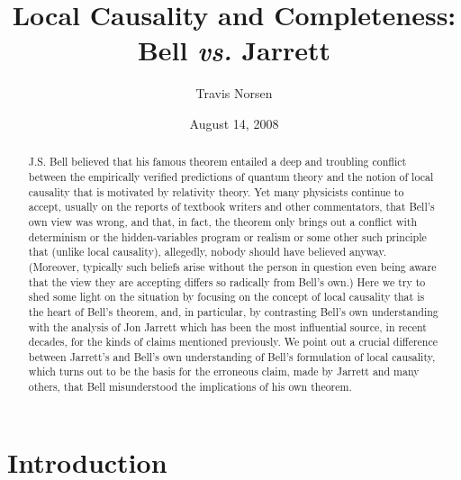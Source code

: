 \documentclass[aps,prc,twocolumn]{revtex4}
\begin{document}
\title{Local Causality and Completeness:  Bell \emph{vs.} Jarrett}
\author{Travis Norsen}

\date{August 14, 2008}

\begin{abstract}
J.S. Bell believed that his famous theorem entailed a deep and
troubling conflict between the empirically verified predictions of
quantum theory and the notion of local causality that is motivated by
relativity theory.  Yet many physicists continue to accept, usually on 
the reports of textbook writers and other commentators, that Bell's
own view was wrong, and that, in fact, the theorem only brings out a
conflict with determinism or the hidden-variables program or realism
or some other such principle that (unlike local causality), allegedly,
nobody should have believed anyway.  (Moreover, typically such beliefs
arise without the person in question even being aware that the view
they are accepting differs so radically from Bell's own.)
Here we try to shed some light
on the situation by focusing on the concept of local causality that is
the heart of Bell's theorem, and, in particular, by contrasting Bell's
own understanding with the analysis of Jon Jarrett which has been the
most influential source, in recent decades, for the kinds of claims
mentioned previously.  We point out a crucial difference between 
Jarrett's and Bell's own understanding of Bell's formulation of 
local causality, which turns out to be the basis for the erroneous 
claim, made by Jarrett and many others, that Bell misunderstood 
the implications of his own theorem. 
\end{abstract}

\maketitle


\section{Introduction}
\end{document}
